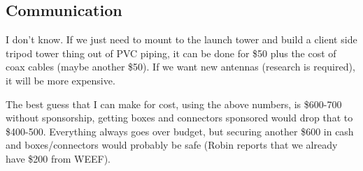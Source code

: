 \documentclass{article}
\begin{document}
        \subsection{Communication}
            I don't know. If we just need to mount to the launch tower and build a client side tripod tower thing out of PVC piping, it can be done for \$50 plus the cost of coax cables (maybe another \$50). If we want new antennas (research is required), it will be more expensive.

\vspace{2cm}

        The best guess that I can make for cost, using the above numbers, is \$600-700 without sponsorship, getting boxes and connectors sponsored would drop that to \$400-500. Everything always goes over budget, but securing another \$600 in cash and boxes/connectors would probably be safe (Robin reports that we already have \$200 from WEEF).
\end{document}
